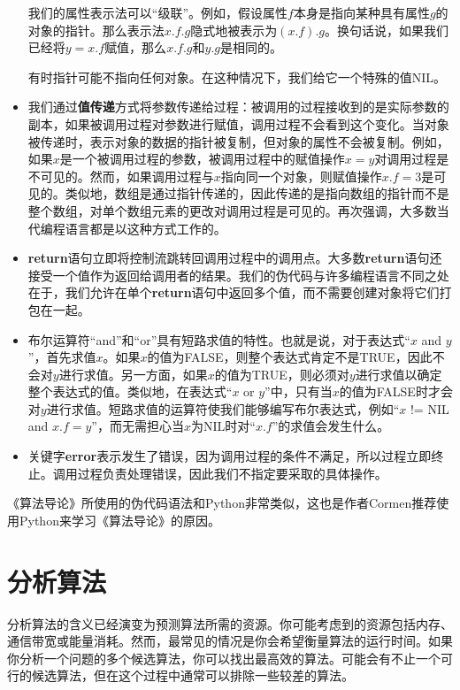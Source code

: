 \documentclass[lang=cn,newtx,10pt,scheme=chinese]{elegantbook}
\begin{document}
\begin{itemize}
    我们的属性表示法可以``级联''。例如，假设属性$f$本身是指向某种具有属性$g$的对象的指针。那么表示法$x.f.g$隐式地被表示为$(x.f).g$。换句话说，如果我们已经将$y = x.f$赋值，那么$x.f.g$和$y.g$是相同的。

    有时指针可能不指向任何对象。在这种情况下，我们给它一个特殊的值NIL。
    \item 我们通过\textbf{值传递}方式将参数传递给过程：被调用的过程接收到的是实际参数的副本，如果被调用过程对参数进行赋值，调用过程不会看到这个变化。当对象被传递时，表示对象的数据的指针被复制，但对象的属性不会被复制。例如，如果$x$是一个被调用过程的参数，被调用过程中的赋值操作$x=y$对调用过程是不可见的。然而，如果调用过程与$x$指向同一个对象，则赋值操作$x.f=3$是可见的。类似地，数组是通过指针传递的，因此传递的是指向数组的指针而不是整个数组，对单个数组元素的更改对调用过程是可见的。再次强调，大多数当代编程语言都是以这种方式工作的。
    \item \textbf{return}语句立即将控制流跳转回调用过程中的调用点。大多数\textbf{return}语句还接受一个值作为返回给调用者的结果。我们的伪代码与许多编程语言不同之处在于，我们允许在单个\textbf{return}语句中返回多个值，而不需要创建对象将它们打包在一起。
    \item 布尔运算符``and''和``or''具有短路求值的特性。也就是说，对于表达式``$x$ and $y$''，首先求值$x$。如果$x$的值为FALSE，则整个表达式肯定不是TRUE，因此不会对$y$进行求值。另一方面，如果$x$的值为TRUE，则必须对$y$进行求值以确定整个表达式的值。类似地，在表达式``$x$ or $y$''中，只有当$x$的值为FALSE时才会对$y$进行求值。短路求值的运算符使我们能够编写布尔表达式，例如``$x$ != NIL and $x.f=y$''，而无需担心当$x$为NIL时对``$x.f$''的求值会发生什么。
    \item 关键字\textbf{error}表示发生了错误，因为调用过程的条件不满足，所以过程立即终止。调用过程负责处理错误，因此我们不指定要采取的具体操作。
\end{itemize}

\begin{marker}
    《算法导论》所使用的伪代码语法和Python非常类似，这也是作者Cormen推荐使用Python来学习《算法导论》的原因。
\end{marker}

\section{分析算法}\label{section-2.2}

分析算法的含义已经演变为预测算法所需的资源。你可能考虑到的资源包括内存、通信带宽或能量消耗。然而，最常见的情况是你会希望衡量算法的运行时间。如果你分析一个问题的多个候选算法，你可以找出最高效的算法。可能会有不止一个可行的候选算法，但在这个过程中通常可以排除一些较差的算法。
\end{document}
